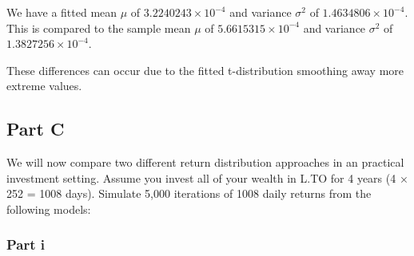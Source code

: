 \documentclass[
  oneside]{book}
\newenvironment{Shaded}{\begin{snugshade}}{\end{snugshade}}
\newcommand{\AttributeTok}[1]{\textcolor[rgb]{0.77,0.63,0.00}{#1}}
\newcommand{\CommentTok}[1]{\textcolor[rgb]{0.56,0.35,0.01}{\textit{#1}}}
\newcommand{\ControlFlowTok}[1]{\textcolor[rgb]{0.13,0.29,0.53}{\textbf{#1}}}
\newcommand{\DecValTok}[1]{\textcolor[rgb]{0.00,0.00,0.81}{#1}}
\newcommand{\FunctionTok}[1]{\textcolor[rgb]{0.00,0.00,0.00}{#1}}
\newcommand{\NormalTok}[1]{#1}
\newcommand{\OtherTok}[1]{\textcolor[rgb]{0.56,0.35,0.01}{#1}}
\newcommand{\SpecialCharTok}[1]{\textcolor[rgb]{0.00,0.00,0.00}{#1}}
\begin{document}
We have a fitted mean \(\mu\) of \ensuremath{3.2240243\times 10^{-4}} and variance \(\sigma^{2}\) of \ensuremath{1.4634806\times 10^{-4}}.
This is compared to the sample mean \(\mu\) of \ensuremath{5.6615315\times 10^{-4}} and variance \(\sigma^2\) of \ensuremath{1.3827256\times 10^{-4}}.

These differences can occur due to the fitted t-distribution smoothing away more extreme values.

\hypertarget{part-c-1}{%
\subsection{Part C}\label{part-c-1}}

We will now compare two different return distribution approaches in an practical investment setting. Assume you invest all of your wealth in L.TO for 4 years (4 × 252 = 1008 days). Simulate 5,000 iterations of 1008 daily returns from the following models:

\hypertarget{part-i}{%
\subsubsection{Part i}\label{part-i}}

\begin{Shaded}
\end{Shaded}
\end{document}
